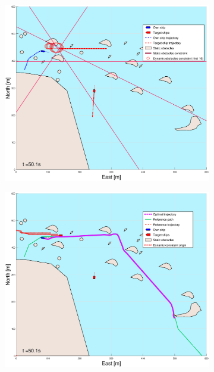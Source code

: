 \begin{figure}[!b]
\begin{subfigure}[b]{0.499\textwidth}
    \end{subfigure}
    \hfill
    \\
    \begin{subfigure}[b]{0.49\textwidth}
        \centering
        \includegraphics[width=\textwidth]{Images/Figures/skjergard_m_trafikk_NEW/_Simple_0fig1_time=50}
    \end{subfigure}
    \hfill
    \begin{subfigure}[b]{0.499\textwidth}
        \centering
        \includegraphics[width=\textwidth]{Images/Figures/skjergard_m_trafikk_NEW/_Simple_0fig999_time=50}

\end{subfigure}
\end{figure}
